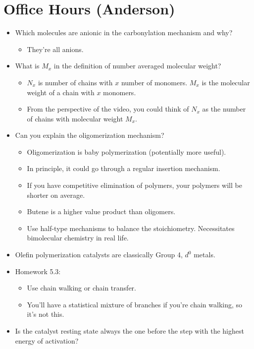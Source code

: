 \documentclass[../notes.tex]{subfiles}
\begin{document}
\section{Office Hours (Anderson)}
\begin{itemize}
    \item {}Which molecules are anionic in the carbonylation mechanism and why?
    \begin{itemize}
        \item They're all anions.
    \end{itemize}
    \item What is $M_x$ in the definition of number averaged molecular weight?
    \begin{itemize}
        \item $N_x$ is number of chains with $x$ number of monomers. $M_x$ is the molecular weight of a chain with $x$ monomers.
        \item From the perspective of the video, you could think of $N_x$ as the number of chains with molecular weight $M_x$.
    \end{itemize}
    \item Can you explain the oligomerization mechanism?
    \begin{itemize}
        \item Oligomerization is baby polymerization (potentially more useful).
        \item In principle, it could go through a regular insertion mechanism.
        \item If you have competitive elimination of polymers, your polymers will be shorter on average.
        \item Butene is a higher value product than oligomers.
        \item Use half-type mechanisms to balance the stoichiometry. Necessitates bimolecular chemistry in real life.
    \end{itemize}
    \item Olefin polymerization catalysts are classically Group 4, $d^0$ metals.
    \item Homework 5.3:
    \begin{itemize}
        \item Use chain walking or chain transfer.
        \item You'll have a statistical mixture of branches if you're chain walking, so it's not this.
    \end{itemize}
    \item Is the catalyst resting state always the one before the step with the highest energy of activation?

\end{itemize}
\end{document}
